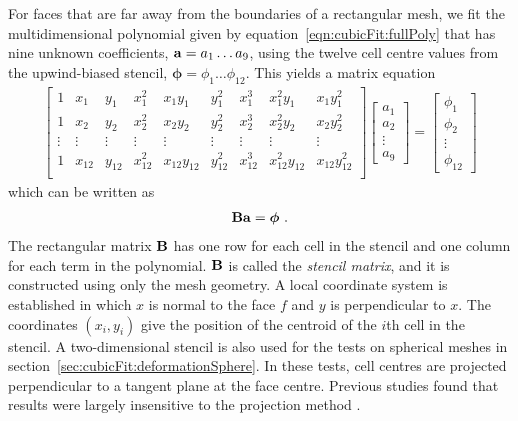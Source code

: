 For faces that are far away from the boundaries of a rectangular mesh, we fit the multidimensional polynomial given by equation~\eqref{eqn:cubicFit:fullPoly} that has nine unknown coefficients, $\mathbf{a} = a_1 \ldots a_9$, using the twelve cell centre values from the upwind-biased stencil, $\bm{\phi} = \phi_1 \ldots \phi_{12}$.  This yields a matrix equation
\begin{align}
	\begin{bmatrix}
		1 & x_1 & y_1 & x_1^2 & x_1 y_1 & y_1^2 & x_1^3 & x_1^2 y_1 & x_1 y_1^2 \\
		1 & x_2 & y_2 & x_2^2 & x_2 y_2 & y_2^2 & x_2^3 & x_2^2 y_2 & x_2 y_2^2 \\
		\vdots & \vdots & \vdots & \vdots & \vdots & \vdots & \vdots & \vdots & \vdots \\
		1 & x_{12} & y_{12} & x_{12}^2 & x_{12} y_{12} & y_{12}^2 & x_{12}^3 & x_{12}^2 y_{12} & x_{12} y_{12}^2 \\
	\end{bmatrix}
	\begin{bmatrix}
		a_1 \\
		a_2 \\
		\vdots \\
		a_9
	\end{bmatrix}
	=
	\begin{bmatrix}
		\phi_1 \\
		\phi_2 \\
		\vdots \\
		\phi_{12}
	\end{bmatrix}
\end{align}
which can be written as
\begin{align}
	\mathbf{B} \mathbf{a} = \bm{\phi} \label{eqn:cubicFit:unweightedLeastSquares} \text{ .}
\end{align}
The rectangular matrix $\mathbf{B}$ has one row for each cell in the stencil and one column for each term in the polynomial.  $\mathbf{B}$ is called the \textit{stencil matrix}, and it is constructed using only the mesh geometry.
A local coordinate system is established in which $x$ is normal to the face $f$ and $y$ is perpendicular to $x$.
The coordinates $(x_i, y_i)$ give the position of the centroid of the $i$th cell in the stencil.
A two-dimensional stencil is also used for the tests on spherical meshes in section~\ref{sec:cubicFit:deformationSphere}.  In these tests, cell centres are projected perpendicular to a tangent plane at the face centre.  Previous studies found that results were largely insensitive to the projection method \citep{skamarock-gassmann2011,lashley2002}.

